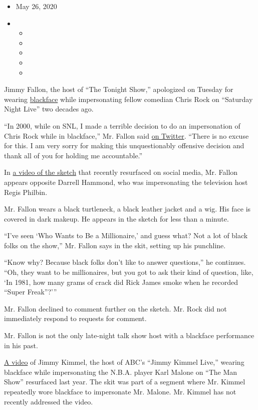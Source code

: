 \begin{itemize}
\item
  May 26, 2020
\item
  \begin{itemize}
  \item
  \item
  \item
  \item
  \item
  \end{itemize}
\end{itemize}

Jimmy Fallon, the host of ``The Tonight Show,'' apologized on Tuesday
for wearing
\href{https://www.nytimes3xbfgragh.onion/2020/06/23/arts/television/30-rock-blackface-Tina-fey.html}{blackface}
while impersonating fellow comedian Chris Rock on ``Saturday Night
Live'' two decades ago.

``In 2000, while on SNL, I made a terrible decision to do an
impersonation of Chris Rock while in blackface,'' Mr. Fallon said
\href{https://twitter.com/jimmyfallon/status/1265386757958389768}{on
Twitter}. ``There is no excuse for this. I am very sorry for making this
unquestionably offensive decision and thank all of you for holding me
accountable.''

In \href{https://youtu.be/V2iFSuyLoIs?t=463}{a video of the sketch} that
recently resurfaced on social media, Mr. Fallon appears opposite Darrell
Hammond, who was impersonating the television host Regis Philbin.

Mr. Fallon wears a black turtleneck, a black leather jacket and a wig.
His face is covered in dark makeup. He appears in the sketch for less
than a minute.

``I've seen `Who Wants to Be a Millionaire,' and guess what? Not a lot
of black folks on the show,'' Mr. Fallon says in the skit, setting up
his punchline.

``Know why? Because black folks don't like to answer questions,'' he
continues. ``Oh, they want to be millionaires, but you got to ask their
kind of question, like, `In 1981, how many grams of crack did Rick James
smoke when he recorded ``Super Freak''?'''

Mr. Fallon declined to comment further on the sketch. Mr. Rock did not
immediately respond to requests for comment.

Mr. Fallon is not the only late-night talk show host with a blackface
performance in his past.

\href{https://www.youtube.com/watch?time_continue=52\&v=5aPbefau2Zc\&feature=emb_logo}{A
video} of Jimmy Kimmel, the host of ABC's ``Jimmy Kimmel Live,'' wearing
blackface while impersonating the N.B.A. player Karl Malone on ``The Man
Show'' resurfaced last year. The skit was part of a segment where Mr.
Kimmel repeatedly wore blackface to impersonate Mr. Malone. Mr. Kimmel
has not recently addressed the video.

